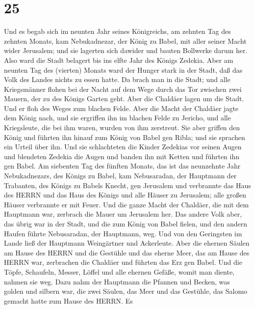 \hypertarget{section-24}{%
\section{25}\label{section-24}}

 Und es begab sich im neunten Jahr seines Königreichs, am
zehnten Tag des zehnten Monats, kam Nebukadnezar, der König zu Babel,
mit aller seiner Macht wider Jerusalem; und sie lagerten sich dawider
und bauten Bollwerke darum her.  Also ward die Stadt
belagert bis ins elfte Jahr des Königs Zedekia.  Aber am
neunten Tag des (vierten) Monats ward der Hunger stark in der Stadt, daß
das Volk des Landes nichts zu essen hatte.  Da brach man in
die Stadt; und alle Kriegsmänner flohen bei der Nacht auf dem Wege durch
das Tor zwischen zwei Mauern, der zu des Königs Garten geht. Aber die
Chaldäer lagen um die Stadt. Und er floh des Weges zum blachen Felde.
 Aber die Macht der Chaldäer jagte dem König nach, und sie
ergriffen ihn im blachen Felde zu Jericho, und alle Kriegsleute, die bei
ihm waren, wurden von ihm zerstreut.  Sie aber griffen den
König und führten ihn hinauf zum König von Babel gen Ribla; und sie
sprachen ein Urteil über ihn.  Und sie schlachteten die
Kinder Zedekias vor seinen Augen und blendeten Zedekia die Augen und
banden ihn mit Ketten und führten ihn gen Babel.  Am
siebenten Tag des fünften Monats, das ist das neunzehnte Jahr
Nebukadnezars, des Königs zu Babel, kam Nebusaradan, der Hauptmann der
Trabanten, des Königs zu Babels Knecht, gen Jerusalem  und
verbrannte das Haus des HERRN und das Haus des Königs und alle Häuser zu
Jerusalem; alle großen Häuser verbrannte er mit Feuer.  Und
die ganze Macht der Chaldäer, die mit dem Hauptmann war, zerbrach die
Mauer um Jerusalem her.  Das andere Volk aber, das übrig
war in der Stadt, und die zum König von Babel fielen, und den andern
Haufen führte Nebusaradan, der Hauptmann, weg.  Und von den
Geringsten im Lande ließ der Hauptmann Weingärtner und Ackerleute.
 Aber die ehernen Säulen am Hause des HERRN und die
Gestühle und das eherne Meer, das am Hause des HERRN war, zerbrachen die
Chaldäer und führten das Erz gen Babel.  Und die Töpfe,
Schaufeln, Messer, Löffel und alle ehernen Gefäße, womit man diente,
nahmen sie weg.  Dazu nahm der Hauptmann die Pfannen und
Becken, was golden und silbern war,  die zwei Säulen, das
Meer und das Gestühle, das Salomo gemacht hatte zum Hause des HERRN. Es
